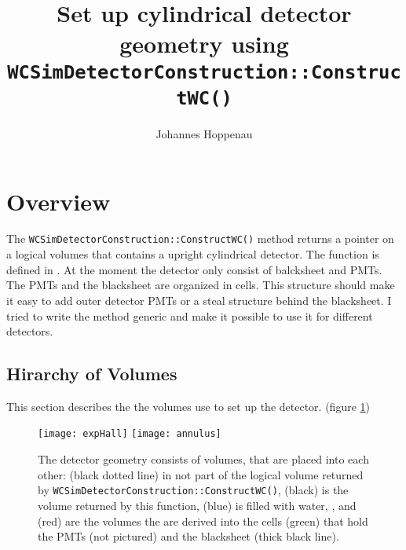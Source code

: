 
\author{Johannes Hoppenau}
\title{Set up cylindrical detector geometry using \LARGE\texttt{WCSimDetectorConstruction::ConstructWC()}}




\maketitle
\tableofcontents


\section{Overview}
The \texttt{WCSimDetectorConstruction::ConstructWC()} method returns a pointer on a logical volumes that contains a upright cylindrical detector. The function is defined in .
At the moment the detector only consist of balcksheet and PMTs. The PMTs and the blacksheet are organized in cells. This structure should make it easy to add outer detector PMTs or a steal structure behind the blacksheet. 
I tried to write the method generic and make it possible to use it for different detectors. 

\subsection{Hirarchy of Volumes}
This section describes the the volumes use to set up the detector. (figure \ref{fig:hi})
\begin{figure}
  \begin{center}
  \texttt{[image: expHall]} 
  \hspace{0.1\textwidth}
  \texttt{[image: annulus]}
  \end{center}
  \caption{The detector geometry consists of volumes, that are placed into each other:  (black dotted line) in not part of the logical volume returned by \texttt{WCSimDetectorConstruction::ConstructWC()},  (black) is the volume returned by this function,  (blue) is filled with water, ,  and   (red) are the volumes the are derived into the cells (green) that hold the PMTs (not pictured) and the blacksheet (thick black line).}\label{fig:hi}
\end{figure}



